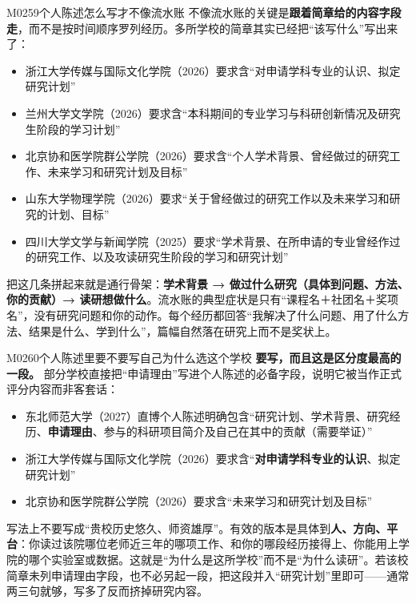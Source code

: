 \begin{qa}{M0259}{个人陈述怎么写才不像流水账}
不像流水账的关键是\textbf{跟着简章给的内容字段走}，而不是按时间顺序罗列经历。多所学校的简章其实已经把“该写什么”写出来了：

\begin{itemize}
  \item 浙江大学传媒与国际文化学院（2026）要求含“对申请学科专业的认识、拟定研究计划”
  \item 兰州大学文学院（2026）要求含“本科期间的专业学习与科研创新情况及研究生阶段的学习计划”
  \item 北京协和医学院群公学院（2026）要求含“个人学术背景、曾经做过的研究工作、未来学习和研究计划及目标”
  \item 山东大学物理学院（2026）要求“关于曾经做过的研究工作以及未来学习和研究的计划、目标”
  \item 四川大学文学与新闻学院（2025）要求“学术背景、在所申请的专业曾经作过的研究工作、以及攻读研究生阶段的学习和研究计划”
\end{itemize}

把这几条拼起来就是通行骨架：\textbf{学术背景 → 做过什么研究（具体到问题、方法、你的贡献）→ 读研想做什么}。流水账的典型症状是只有“课程名＋社团名＋奖项名”，没有研究问题和你的动作。每个经历都回答“我解决了什么问题、用了什么方法、结果是什么、学到什么”，篇幅自然落在研究上而不是奖状上。
\end{qa}

\begin{qa}{M0260}{个人陈述里要不要写自己为什么选这个学校}
\textbf{要写，而且这是区分度最高的一段。} 部分学校直接把“申请理由”写进个人陈述的必备字段，说明它被当作正式评分内容而非客套话：

\begin{itemize}
  \item 东北师范大学（2027）直博个人陈述明确包含“研究计划、学术背景、研究经历、\textbf{申请理由}、参与的科研项目简介及自己在其中的贡献（需要举证）”
  \item 浙江大学传媒与国际文化学院（2026）要求含“\textbf{对申请学科专业的认识}、拟定研究计划”
  \item 北京协和医学院群公学院（2026）要求含“未来学习和研究计划及目标”
\end{itemize}

写法上不要写成“贵校历史悠久、师资雄厚”。有效的版本是具体到\textbf{人、方向、平台}：你读过该院哪位老师近三年的哪项工作、和你的哪段经历接得上、你能用上学院的哪个实验室或数据。这就是“为什么是这所学校”而不是“为什么读研”。若该校简章未列申请理由字段，也不必另起一段，把这段并入“研究计划”里即可——通常两三句就够，写多了反而挤掉研究内容。
\end{qa}

